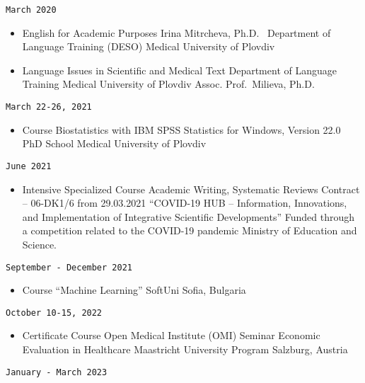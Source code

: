 \documentclass[
  12pt,
  letterpaper,
  DIV=11,
  numbers=noendperiod]{scrartcl}
\providecommand{\tightlist}{%
  \setlength{\itemsep}{0pt}\setlength{\parskip}{0pt}}\usepackage{longtable,booktabs,array}
\begin{document}
\texttt{March\ 2020}

\begin{itemize}
\item
  English for Academic Purposes \textbar{} Irina Mitrcheva,
  Ph.D.~\textbar{} Department of Language Training (DESO) \textbar{}
  Medical University of Plovdiv
\item
  Language Issues in Scientific and Medical Text \textbar{} Department
  of Language Training \textbar{} Medical University of Plovdiv
  \textbar{} Assoc. Prof.~Milieva, Ph.D.
\end{itemize}

\texttt{March\ 22-26,\ 2021}

\begin{itemize}
\tightlist
\item
  Course \textbar{} Biostatistics with IBM SPSS Statistics for Windows,
  Version 22.0 \textbar{} PhD School \textbar{} Medical University of
  Plovdiv
\end{itemize}

\texttt{June\ 2021}

\begin{itemize}
\tightlist
\item
  Intensive Specialized Course \textbar{} Academic Writing, Systematic
  Reviews \textbar{} Contract -- 06-DK1/6 from 29.03.2021 \textbar{}
  ``COVID-19 HUB -- Information, Innovations, and Implementation of
  Integrative Scientific Developments'' \textbar{} Funded through a
  competition related to the COVID-19 pandemic \textbar{} Ministry of
  Education and Science.
\end{itemize}

\texttt{September\ -\ December\ 2021}

\begin{itemize}
\tightlist
\item
  Course ``Machine Learning'' \textbar{} SoftUni \textbar{} Sofia,
  Bulgaria
\end{itemize}

\texttt{October\ 10-15,\ 2022}

\begin{itemize}
\tightlist
\item
  Certificate Course \textbar{} Open Medical Institute (OMI) Seminar
  \textbar{} Economic Evaluation in Healthcare \textbar{} Maastricht
  University Program \textbar{} Salzburg, Austria
\end{itemize}

\texttt{January\ -\ March\ 2023}
\end{document}
